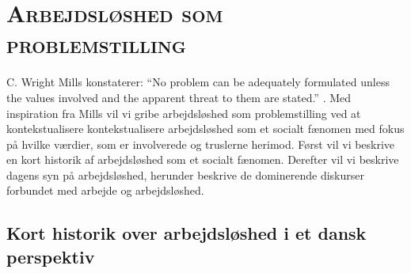 

\newpage \section{\textsc{Arbejdsløshed som problemstilling} \label{}}

C. Wright Mills konstaterer: “No problem can be adequately formulated unless the values involved and the apparent threat to them are stated.” \textbf{\parencite[129]{Mills1959}}. Med inspiration fra Mills vil vi gribe arbejdsløshed som problemstilling ved at kontekstualisere kontekstualisere arbejdsløshed som et socialt fænomen med fokus på hvilke værdier, som er involverede og truslerne herimod. Først vil vi beskrive en kort historik af arbejdsløshed som et socialt fænomen. Derefter vil vi beskrive dagens syn på arbejdsløshed, herunder beskrive de dominerende diskurser forbundet med arbejde og arbejdsløshed. %


\subsection{Kort historik over arbejdsløshed i et dansk perspektiv} 

